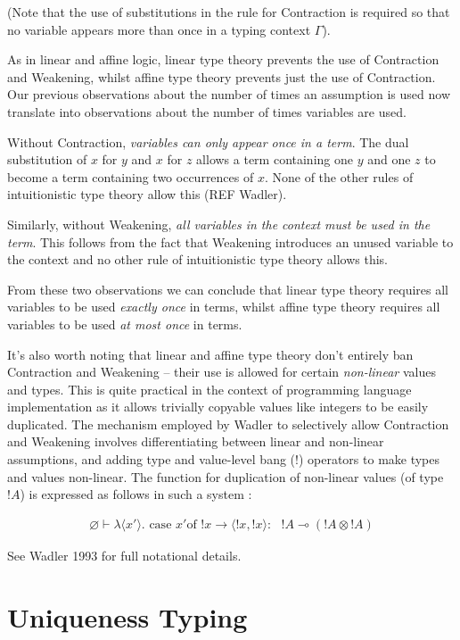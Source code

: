 \documentclass[]{unswthesis}
\newcommand{\case}{\text{ case }}
\newcommand{\of}{\text{of }}
\newcommand{\yields}{\multimap}
\begin{document}
(Note that the use of substitutions in the rule for Contraction is required so that no variable appears more than once in a typing context $\Gamma$).

As in linear and affine logic, linear type theory prevents the use of Contraction and Weakening, whilst affine type theory prevents just the use of Contraction. Our previous observations about the number of times an assumption is used now translate into observations about the number of times variables are used.

Without Contraction, \textit{variables can only appear once in a term}. The dual substitution of $x$ for $y$ and $x$ for $z$ allows a term containing one $y$ and one $z$ to become a term containing two occurrences of $x$. None of the other rules of intuitionistic type theory allow this (REF Wadler).

Similarly, without Weakening, \textit{all variables in the context must be used in the term}. This follows from the fact that Weakening introduces an unused variable to the context and no other rule of intuitionistic type theory allows this.

From these two observations we can conclude that linear type theory requires all variables to be used \textit{exactly once} in terms, whilst affine type theory requires all variables to be used \textit{at most once} in terms.

It's also worth noting that linear and affine type theory don't entirely ban Contraction and Weakening -- their use is allowed for certain \textit{non-linear} values and types. This is quite practical in the context of programming language implementation as it allows trivially copyable values like integers to be easily duplicated. The mechanism employed by Wadler to selectively allow Contraction and Weakening involves differentiating between linear and non-linear assumptions, and adding type and value-level bang (!) operators to make types and values non-linear. The function for duplication of non-linear values (of type $!A$) is expressed as follows in such a system :

\begin{eqnarray*}
\varnothing \vdash \lambda \langle x' \rangle . \case x' \of !x \rightarrow \langle !x, !x\rangle :\text{ } !A \yields (!A \otimes !A)
\end{eqnarray*}

See Wadler 1993 for full notational details.

\section{Uniqueness Typing}
\end{document}
